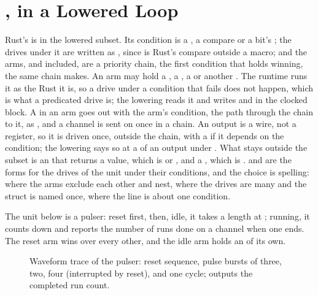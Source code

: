 \section{, in a Lowered Loop}
\label{sec:x-if}

Rust's  is in the lowered subset. Its condition is a
, a compare or a bit's ; the drives under
it are written as , since \code{<=} is Rust's compare
outside a macro; and the arms,  and 
included, are a priority chain, the first condition that holds
winning, the same chain  makes. An arm may hold a
, a , a  or another . The
runtime runs it as the Rust it is, so a drive under a condition that
fails does not happen, which is what a predicated drive is; the
lowering reads it and writes  and  in the
clocked block. A  in an arm goes out with the arm's
condition, the path through the chain to it, as , and a
channel is sent on once in a chain. An output is a wire, not a
register, so it is driven once, outside the chain, with a 
if it depends on the condition; the lowering says so at a 
of an output under . What stays outside the subset is an
 that returns a value, which is  or
, and a , which is .
 and  are the forms for the drives of the
unit under their conditions, and the choice is spelling: 
where the arms exclude each other and nest,  where the
drives are many and the struct is named once,  where the
line is about one condition.

The unit below is a pulser: reset first, then, idle, it takes a
length at ; running, it counts down and reports the number
of runs done on a channel when one ends. The reset arm wins over
every other, and the idle arm holds an  of its own.

\begin{figure}[htbp]
\centering

\caption{Waveform trace of the pulser: reset sequence, pulse bursts of three, two, four (interrupted by reset), and one cycle;  outputs the completed run count.}
\label{fig:x-if}
\end{figure}




